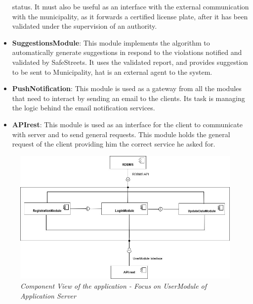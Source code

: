 \begin{itemize}
  status. It must also be useful as an interface with the external communication with the municipality, as it forwards a 
  certified license plate, after it has been validated under the supervision of an authority.
  \item \textbf{SuggestionsModule}: This module implements the algorithm to automatically generate suggestions in respond to the
  violations notified and validated by SafeStreets. It uses the validated report, and provides suggestion to be sent to Municipality,
  hat is an external agent to the system.
  \item \textbf{PushNotification}: This module is used as a gateway from all the modules that need to interact by 
  sending an email to the clients. Its task is managing the logic behind the email notification services.
  \item \textbf{APIrest}: This module is used as an interface for the client to communicate with server and to send
  general requests. This module holds the general request of the client providing him the correct service he asked for.
\end{itemize}

\begin{figure}[H]
  \centering
  \includegraphics[width=\textwidth]{DD_Images/ComponentView/componentViewUserModuleZoom.jpg}
  \caption{\textit{Component View of the application - Focus on UserModule of Application Server}}
\end{figure}

